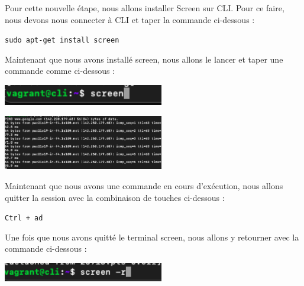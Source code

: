 \documentclass[12pt]{article}
\begin{document}
\vspace{0.3cm}

Pour cette nouvelle étape, nous allons installer Screen sur CLI. Pour ce faire, nous devons nous connecter à CLI et taper la commande ci-dessous :

\texttt{sudo apt-get install screen}

\vspace{0.3cm}

Maintenant que nous avons installé screen, nous allons le lancer et taper une commande comme ci-dessous :

\vspace{0.3cm}

\begin{center}
  \includegraphics[width=7cm]{Images-Client-SSH/Image-TD-SSH-9/screen.png}
\end{center}

\vspace{0.3cm}

\begin{center}
  \includegraphics[width=7cm]{Images-Client-SSH/Image-TD-SSH-9/ping.png}
\end{center}

\vspace{0.3cm}

Maintenant que nous avons une commande en cours d'exécution, nous allons quitter la session avec la combinaison de touches ci-dessous :

\texttt{Ctrl + ad}

\newpage

\vspace{0.3cm}

Une fois que nous avons quitté le terminal screen, nous allons y retourner avec la commande ci-dessous :

\vspace{0.3cm}

\begin{center}
  \includegraphics[width=7cm]{Images-Client-SSH/Image-TD-SSH-9/screen_r.png}
\end{center}
\end{document}
